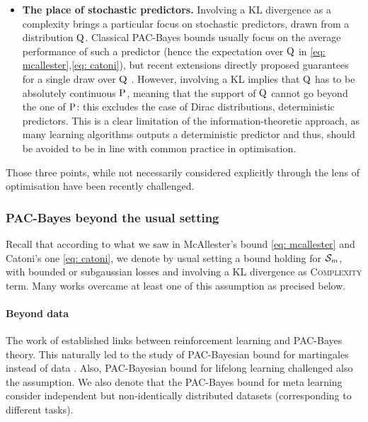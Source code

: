 \begin{itemize}
  \item \textbf{The place of stochastic predictors.} Involving a KL divergence as a complexity brings a particular focus on stochastic predictors, drawn from a distribution $\Q$. Classical PAC-Bayes bounds usually focus on the average performance of such a predictor (hence the expectation over $\Q$ in \eqref{eq: mcallester},\eqref{eq: catoni}), but recent extensions directly proposed guarantees for a single draw over $\Q$ \citep{rivasplata2020pac,viallard2023general}. However, involving a KL implies that $\Q$ has to be absolutely continuous \wrt $\P$,  meaning that the support of $\Q$ cannot go beyond the one of $\P$: this excludes the case of Dirac distributions, \ie deterministic predictors. This is a clear limitation of the information-theoretic approach, as many learning algorithms outputs a deterministic predictor and thus, should be avoided to be in line with common practice in optimisation.
\end{itemize}

Those three points, while not necessarily considered explicitly through the lens of optimisation have been recently challenged.



\subsubsection*{PAC-Bayes beyond the usual setting}

Recall that according to what we saw in McAllester's bound \eqref{eq: mcallester} and Catoni's one \eqref{eq: catoni}, we denote by usual setting a bound holding for \iid $\Sm$, with bounded or subgaussian losses and involving a KL divergence as \textsc{Complexity} term. Many works overcame at least one of this assumption as precised below. 

\paragraph{Beyond \iid data} The work of \citet{fard2010pac} established links between reinforcement learning and PAC-Bayes theory. This naturally led to the study of PAC-Bayesian bound for martingales instead of \iid data \citep{seldin2011pac,seldin2012bandit,seldin2012pac}. Also, PAC-Bayesian bound for lifelong learning \citep{pentina2014pac,flynn2022pac} challenged also the \iid assumption. We also denote that the PAC-Bayes bound for meta learning \citep{amit2018meta,farid2021generalization,rothfuss2021pacoh,rothfuss2022pac,ding2021bridging} consider independent but non-identically distributed datasets (corresponding to different tasks).

